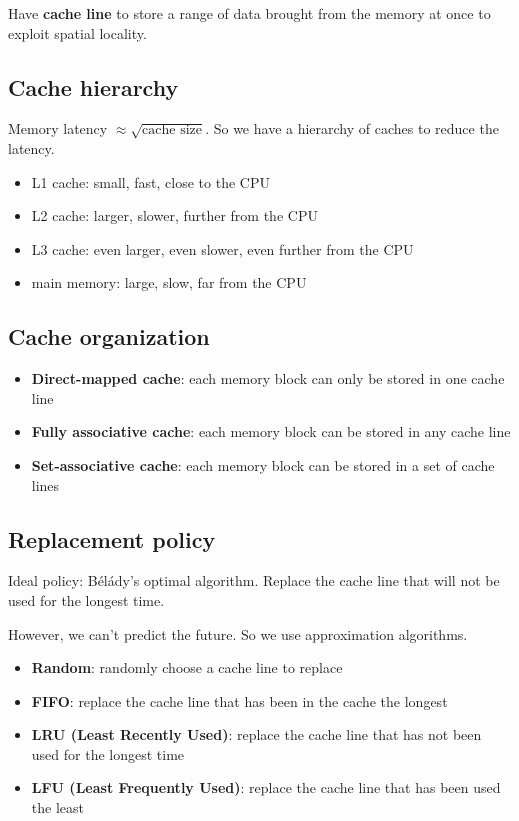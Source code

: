 \documentclass[letterpaper,12pt]{article}
\begin{document}
Have \textbf{cache line} to store a range of data brought from the memory at once to exploit spatial locality.
\subsection{Cache hierarchy}
Memory latency $\approx \sqrt{\text{cache size}}$. So we have a hierarchy of caches to reduce the latency.

\begin{itemize}
    \item L1 cache: small, fast, close to the CPU
    \item L2 cache: larger, slower, further from the CPU
    \item L3 cache: even larger, even slower, even further from the CPU
    \item main memory: large, slow, far from the CPU
\end{itemize}
\subsection{Cache organization}
\begin{itemize}
    \item \textbf{Direct-mapped cache}: each memory block can only be stored in one cache line
    \item \textbf{Fully associative cache}: each memory block can be stored in any cache line
    \item \textbf{Set-associative cache}: each memory block can be stored in a set of cache lines
\end{itemize}
\subsection{Replacement policy}
Ideal policy: Bélády's optimal algorithm. Replace the cache line that will not be used for the longest time.

However, we can't predict the future. So we use approximation algorithms.
\begin{itemize}
    \item \textbf{Random}: randomly choose a cache line to replace
    \item \textbf{FIFO}: replace the cache line that has been in the cache the longest
    \item \textbf{LRU (Least Recently Used)}: replace the cache line that has not been used for the longest time
    \item \textbf{LFU (Least Frequently Used)}: replace the cache line that has been used the least
\end{itemize}
\end{document}
